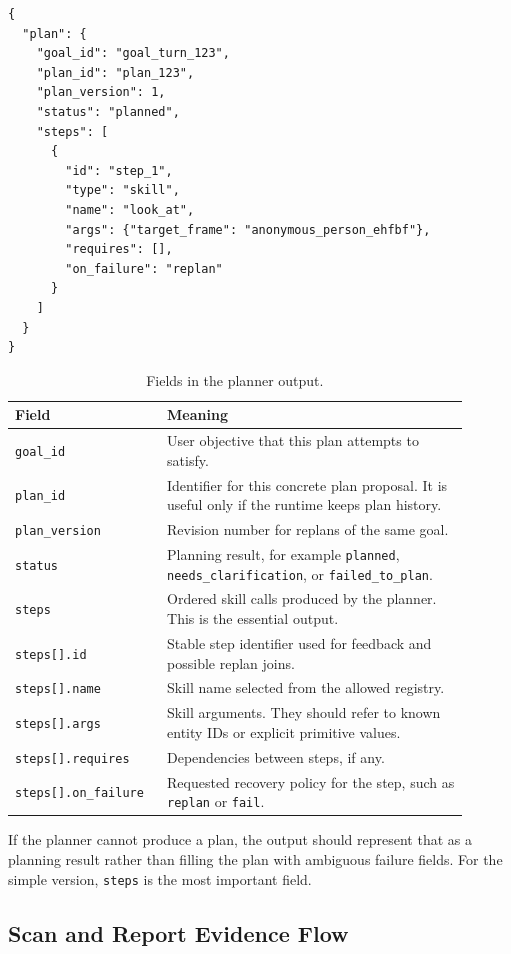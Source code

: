 \documentclass[12pt,a4paper]{article}
\newcommand{\code}[1]{\texttt{#1}}
\begin{document}
\begin{lstlisting}
{
  "plan": {
    "goal_id": "goal_turn_123",
    "plan_id": "plan_123",
    "plan_version": 1,
    "status": "planned",
    "steps": [
      {
        "id": "step_1",
        "type": "skill",
        "name": "look_at",
        "args": {"target_frame": "anonymous_person_ehfbf"},
        "requires": [],
        "on_failure": "replan"
      }
    ]
  }
}
\end{lstlisting}

\begin{longtable}{p{0.28\linewidth}p{0.62\linewidth}}
\caption{Fields in the planner output.}\label{tab:planner-output-fields}\\
\toprule
Field & Meaning\\
\midrule
\code{goal\_id} & User objective that this plan attempts to satisfy.\\
\code{plan\_id} & Identifier for this concrete plan proposal. It is useful only if the runtime keeps plan history.\\
\code{plan\_version} & Revision number for replans of the same goal.\\
\code{status} & Planning result, for example \code{planned}, \code{needs\_clarification}, or \code{failed\_to\_plan}.\\
\code{steps} & Ordered skill calls produced by the planner. This is the essential output.\\
\code{steps[].id} & Stable step identifier used for feedback and possible replan joins.\\
\code{steps[].name} & Skill name selected from the allowed registry.\\
\code{steps[].args} & Skill arguments. They should refer to known entity IDs or explicit primitive values.\\
\code{steps[].requires} & Dependencies between steps, if any.\\
\code{steps[].on\_failure} & Requested recovery policy for the step, such as \code{replan} or \code{fail}.\\
\bottomrule
\end{longtable}

If the planner cannot produce a plan, the output should represent that as a planning result rather than filling the plan with ambiguous failure fields. For the simple version, \code{steps} is the most important field.

\subsection{Scan and Report Evidence Flow}
\end{document}

